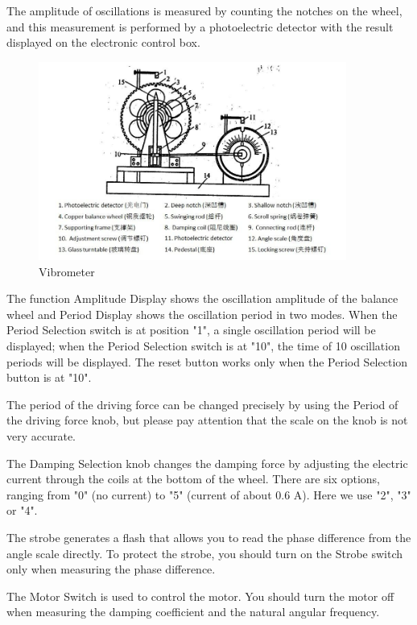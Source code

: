     The amplitude of oscillations is measured by counting the notches on the wheel, and this measurement is performed by a photoelectric detector with the result displayed on the electronic control box.

    \begin{figure}[H]
    \centering
        \includegraphics[width=0.9\textwidth]{images/2}
        \caption{Vibrometer}\label{vib}
    \end{figure}

    The function Amplitude Display shows the oscillation amplitude of the balance wheel and Period Display shows the oscillation period in two modes. When the Period Selection switch is at position "1", a single oscillation period will be displayed; when the Period Selection switch is at "10", the time of 10 oscillation periods will be displayed. The reset button works only when the Period Selection button is at "10". 
    
    The period of the driving force can be changed precisely by using the Period of the driving force knob, but please pay attention that the scale on the knob is not very accurate.

    The Damping Selection knob changes the damping force by adjusting the electric current through the coils at the bottom of the wheel. There are six options, ranging from "0" (no current) to "5" (current of about 0.6 A). Here we use "2", "3" or "4".

    The strobe generates a flash that allows you to read the phase difference from the angle scale directly. To protect the strobe, you should turn on the Strobe switch only when measuring the phase difference.

    The Motor Switch is used to control the motor. You should turn the motor off when measuring the damping coefficient and the natural angular frequency.

